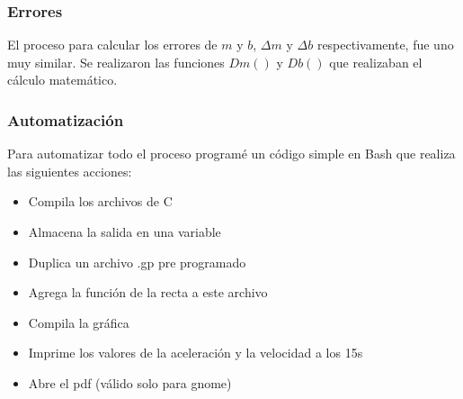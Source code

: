 \documentclass{beamer}
\begin{document}
\begin{frame}
    \frametitle{Errores}

    El proceso para calcular los errores de $m$ y $b$, $\Delta m$ y $\Delta b$ respectivamente, fue uno muy similar. Se realizaron las funciones $Dm()$ y $Db()$ que realizaban el cálculo matemático.

\end{frame}

\begin{frame}
    \frametitle{Automatización}

    Para automatizar todo el proceso programé un código simple en Bash que realiza las siguientes acciones:

    \begin{itemize}[<+- | alert@+>]
        \item Compila los archivos de C
        \item Almacena la salida en una variable
        \item Duplica un archivo .gp pre programado
        \item Agrega la función de la recta a este archivo
        \item Compila la gráfica
        \item Imprime los valores de la aceleración y la velocidad a los 15s
        \item Abre el pdf (válido solo para gnome)
    \end{itemize}

\end{frame}

{ 
\begin{frame}

\end{frame}}
\end{document}
